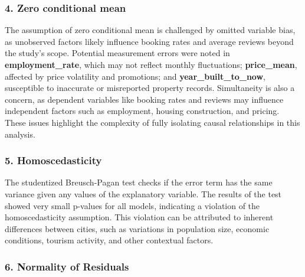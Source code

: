 \documentclass[
  12pt,
]{article}
\begin{document}
\subsubsection{4. Zero conditional mean}\label{zero-conditional-mean}

The assumption of zero conditional mean is challenged by omitted
variable bias, as unobserved factors likely influence booking rates and
average reviews beyond the study's scope. Potential measurement errors
were noted in \textbf{employment\_rate}, which may not reflect monthly
fluctuations; \textbf{price\_mean}, affected by price volatility and
promotions; and \textbf{year\_built\_to\_now}, susceptible to inaccurate
or misreported property records. Simultaneity is also a concern, as
dependent variables like booking rates and reviews may influence
independent factors such as employment, housing construction, and
pricing. These issues highlight the complexity of fully isolating causal
relationships in this analysis.

\subsubsection{5. Homoscedasticity}\label{homoscedasticity}

The studentized Breusch-Pagan test checks if the error term has the same
variance given any values of the explanatory variable. The results of
the test showed very small p-values for all models, indicating a
violation of the homoscedasticity assumption. This violation can be
attributed to inherent differences between cities, such as variations in
population size, economic conditions, tourism activity, and other
contextual factors.

\subsubsection{6. Normality of Residuals}\label{normality-of-residuals}
\end{document}
